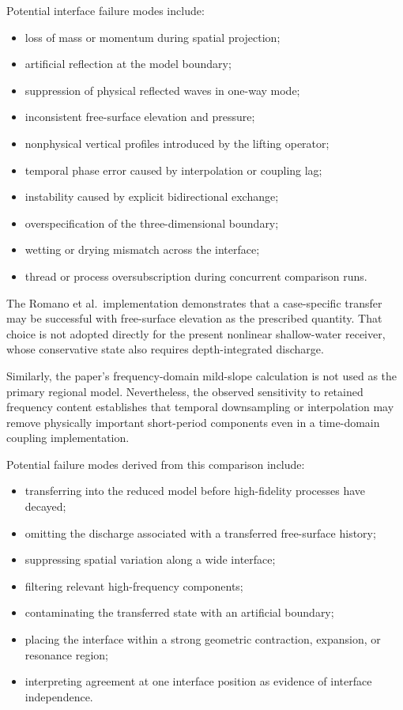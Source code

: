 
Potential interface failure modes include:
\begin{itemize}
  \item loss of mass or momentum during spatial projection;
  \item artificial reflection at the model boundary;
  \item suppression of physical reflected waves in one-way mode;
  \item inconsistent free-surface elevation and pressure;
  \item nonphysical vertical profiles introduced by the lifting operator;
  \item temporal phase error caused by interpolation or coupling lag;
  \item instability caused by explicit bidirectional exchange;
  \item overspecification of the three-dimensional boundary;
  \item wetting or drying mismatch across the interface;
  \item thread or process oversubscription during concurrent comparison runs.
\end{itemize}

The Romano et al.\ implementation demonstrates that a case-specific
transfer may be successful with free-surface elevation as the prescribed
quantity. That choice is not adopted directly for the present nonlinear
shallow-water receiver, whose conservative state also requires
depth-integrated discharge.

Similarly, the paper's frequency-domain mild-slope calculation is not
used as the primary regional model. Nevertheless, the observed
sensitivity to retained frequency content establishes that temporal
downsampling or interpolation may remove physically important
short-period components even in a time-domain coupling implementation.

Potential failure modes derived from this comparison include:

\begin{itemize}
    \item transferring into the reduced model before high-fidelity
          processes have decayed;
    \item omitting the discharge associated with a transferred
          free-surface history;
    \item suppressing spatial variation along a wide interface;
    \item filtering relevant high-frequency components;
    \item contaminating the transferred state with an artificial
          boundary;
    \item placing the interface within a strong geometric contraction,
          expansion, or resonance region;
    \item interpreting agreement at one interface position as evidence
          of interface independence.
\end{itemize}

